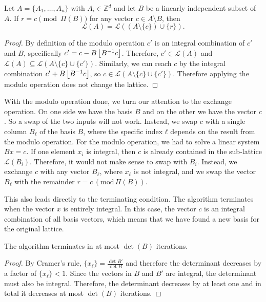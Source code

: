 \begin{lemma}
  \label{lem:lattice-mod}
  Let $A = \{A_1, \dots, A_n\}$ with $A_i ∈ ℤ^d$ and let $B$ be a linearly independent subset of $A$.
  If $r = c \pmod{Π(B)}$ for any vector $c ∈ A \setminus B$, then
  \[
    \mathcal L(A) = \mathcal L((A \setminus \{c\}) ∪ \{r\}).
  \]
\end{lemma}

\begin{proof}
  By definition of the modulo operation $c'$ is an integral combination of $c'$ and $B$,
  specifically $c' = c - B \left\lfloor B^{-1} c\right\rfloor$.
  Therefore, $c' ∈ \mathcal L(A)$ and $\mathcal L(A) ⊆ \mathcal L(A \setminus \{c\} ∪ \{c'\})$.
  Similarly, we can reach $c$ by the integral combination $c' + B \left\lfloor B^{-1} c\right\rfloor$,
  so $c ∈ \mathcal L(A \setminus \{c\} ∪ \{c'\})$.
  Therefore applying the modulo operation does not change the lattice.
\end{proof}

With the modulo operation done, we turn our attention to the exchange operation.
On one side we have the basis $B$ and on the other we have the vector $c$.
So a swap of the two inputs will not work.
Instead, we swap $c$ with a single column $B_ℓ$ of the basis $B$,
where the specific index $ℓ$ depends on the result from the modulo operation.
For the modulo operation, we had to solve a linear system $Bx = c$.
If one element $x_i$ is integral, then $c$ is already contained in the
sub-lattice $\mathcal L(B_i)$.
Therefore, it would not make sense to swap with $B_i$.
Instead, we exchange $c$ with any vector $B_ℓ$, where $x_ℓ$ is not integral,
and we swap the vector $B_ℓ$ with the remainder $r = c \, (\mathrm{mod} \, Π(B))$.

This also leads directly to the terminating condition.
The algorithm terminates when the vector $x$ is entirely integral.
In this case, the vector $c$ is an integral combination of all basis vectors,
which means that we have found a new basis for the original lattice.

\begin{lemma}
  \label{lem:termination}
  The algorithm terminates in at most $\det(B)$ iterations.
\end{lemma}

\begin{proof}
  By Cramer's rule, $\{x_ℓ\} = \frac{\det B'}{\det B}$
  and therefore the determinant decreases by a factor of $\{x_ℓ\} < 1$.
  Since the vectors in $B$ and $B'$ are integral, the determinant must also be integral.
  Therefore, the determinant decreases by at least one and in total it
  decreases at most $\det(B)$ iterations.
\end{proof}

